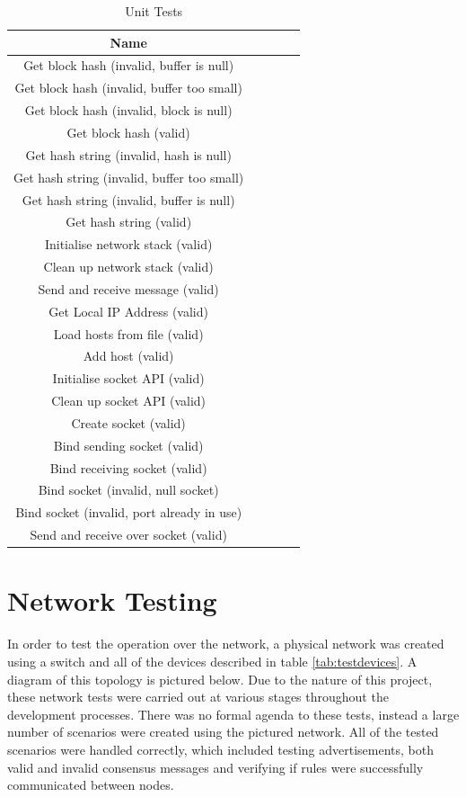 \documentclass[a4paper, 11pt]{report}
\begin{document}
\begin{table}[H]
\centering
\begin{tabular}{ |c|c|c|c|c| } 
\hline
Name\\
\hline
Get block hash (invalid, buffer is null)\\
Get block hash (invalid, buffer too small)\\
Get block hash (invalid, block is null)\\
Get block hash (valid)\\
Get hash string (invalid, hash is null)\\
Get hash string (invalid, buffer too small)\\
Get hash string (invalid, buffer is null)\\
Get hash string (valid)\\
Initialise network stack (valid)\\
Clean up network stack (valid)\\
Send and receive message (valid)\\
Get Local IP Address (valid)\\
Load hosts from file (valid)\\
Add host (valid)\\
Initialise socket API (valid)\\
Clean up socket API (valid)\\
Create socket (valid)\\
Bind sending socket (valid)\\
Bind receiving socket (valid)\\
Bind socket (invalid, null socket)\\
Bind socket (invalid, port already in use)\\
Send and receive over socket (valid)\\
\hline
\end{tabular}
\caption{Unit Tests}
\label{tab:unittests}
\end{table}
\fi

\section{Network Testing}
In order to test the operation over the network, a physical network was created using a switch and all of the devices described in table \ref{tab:testdevices}. A diagram of this topology is pictured below. Due to the nature of this project, these network tests were carried out at various stages throughout the development processes. There was no formal agenda to these tests, instead a large number of scenarios were created using the pictured network. All of the tested scenarios were handled correctly, which included testing advertisements, both valid and invalid consensus messages and verifying if rules were successfully communicated between nodes.
\end{document}
